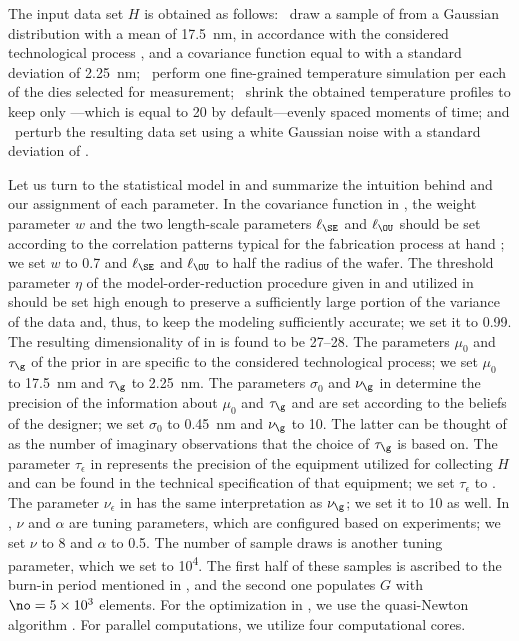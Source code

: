 The input data set $H$ is obtained as follows: \one~draw a sample of \g from a
Gaussian distribution with a mean of 17.5~nm, in accordance with the considered
technological process \cite{ptm}, and a covariance function equal to
 with a standard deviation of 2.25~nm; \two~perform
one fine-grained temperature simulation per each of the \hnd dies selected for
measurement; \three~shrink the obtained temperature profiles to keep only
\ns---which is equal to 20 by default---evenly spaced moments of time; and
\four~perturb the resulting data set using a white Gaussian noise with a
standard deviation of .

Let us turn to the statistical model in  and
summarize the intuition behind and our assignment of each parameter. In the
covariance function in , the weight parameter $w$ and
the two length-scale parameters $\ell_\SE$ and $\ell_\OU$ should be set
according to the correlation patterns typical for the fabrication process at
hand \cite{chandrakasan2000, cheng2011}; we set $w$ to 0.7 and $\ell_\SE$ and
$\ell_\OU$ to half the radius of the wafer. The threshold parameter $\eta$ of
the model-order-reduction procedure given in  and utilized
in  should be set high enough to preserve a
sufficiently large portion of the variance of the data and, thus, to keep the
modeling sufficiently accurate; we set it to 0.99. The resulting dimensionality
\nz of \vz in  is found to be 27--28. The parameters
$\mu_0$ and $\tau_\g$ of the prior in  are specific to the
considered technological process; we set $\mu_0$ to 17.5~nm and $\tau_\g$ to
2.25~nm. The parameters $\sigma_0$ and $\nu_\g$ in 
determine the precision of the information about $\mu_0$ and $\tau_\g$ and are
set according to the beliefs of the designer; we set $\sigma_0$ to 0.45~nm and
$\nu_\g$ to 10. The latter can be thought of as the number of imaginary
observations that the choice of $\tau_\g$ is based on. The parameter
$\tau_\epsilon$ in  represents the precision of the
equipment utilized for collecting $H$ and can be found in the technical
specification of that equipment; we set $\tau_\epsilon$ to . The
parameter $\nu_\epsilon$ in  has the same interpretation
as $\nu_\g$; we set it to 10 as well. In , $\nu$ and
$\alpha$ are tuning parameters, which are configured based on experiments; we
set $\nu$ to 8 and $\alpha$ to 0.5. The number of sample draws is another tuning
parameter, which we set to 10\textsuperscript{4}. The first half of these
samples is ascribed to the burn-in period mentioned in
, and the second one populates $G$ with $\no = 5
\times 10^3$ elements. For the optimization in , we
use the quasi-Newton algorithm \cite{press2007}. For parallel computations, we
utilize four computational cores.

